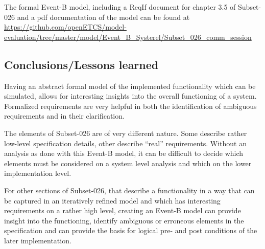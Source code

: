 The formal Event-B model, including a ReqIf document for chapter 3.5 of Subset-026
and a pdf documentation of the model can be found at
\url{https://github.com/openETCS/model-evaluation/tree/master/model/Event_B_Systerel/Subset_026_comm_session}

\subsection{Conclusions/Lessons learned}

Having an abstract formal model of the implemented functionality which can be
simulated, allows for interesting insights into the overall functioning of a
system. Formalized requirements are very helpful in both the identification of
ambiguous requirements and in their clarification.

The elements of Subset-026 are of very different nature. Some describe rather
low-level specification details, other describe ``real'' requirements. Without
an analysis as done with this Event-B model, it can be difficult to decide which
elements must be considered on a system level analysis and which on the lower
implementation level.


For other sections of Subset-026, that describe a functionality in a way that can be
captured in an iteratively refined model and which has interesting requirements
on a rather high level, creating an Event-B model can provide insight into the
functioning, identify ambiguous or erroneous elements in the specification and
can provide the basis for logical pre- and post conditions of the later
implementation.

